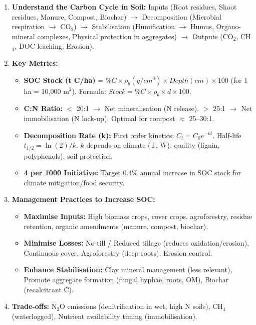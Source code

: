 \documentclass[11pt]{article}
\begin{document}
\begin{methode}
\begin{enumerate}
\item \textbf{Understand the Carbon Cycle in Soil:} Inputs (Root residues, Shoot residues, Manure, Compost, Biochar) $\rightarrow$ Decomposition (Microbial respiration $\rightarrow$ CO$_2$) $\rightarrow$ Stabilisation (Humification $\rightarrow$ Humus, Organo-mineral complexes, Physical protection in aggregates) $\rightarrow$ Outputs (CO$_2$, CH$_4$, DOC leaching, Erosion).
\item \textbf{Key Metrics:}
      \begin{itemize}
      \item \textbf{SOC Stock (t C/ha)} = $\%C \times \rho_b (g/cm^3) \times Depth (cm) \times 100$ (for 1 ha = 10,000 m$^2$). Formula: $Stock = \%C \times \rho_b \times d \times 100$.
      \item \textbf{C:N Ratio:} $<$ 20:1 $\rightarrow$ Net mineralisation (N release). $>$ 25:1 $\rightarrow$ Net immobilisation (N lock-up). Optimal for compost $\approx$ 25--30:1.
      \item \textbf{Decomposition Rate (k):} First order kinetics: $C_t = C_0 e^{-kt}$. Half-life $t_{1/2} = \ln(2)/k$. $k$ depends on climate (T, W), quality (lignin, polyphenols), soil protection.
      \item \textbf{4 per 1000 Initiative:} Target 0.4\% annual increase in SOC stock for climate mitigation/food security.
      \end{itemize}
\item \textbf{Management Practices to Increase SOC:}
      \begin{itemize}
      \item \textbf{Maximise Inputs:} High biomass crops, cover crops, agroforestry, residue retention, organic amendments (manure, compost, biochar).
      \item \textbf{Minimise Losses:} No-till / Reduced tillage (reduces oxidation/erosion), Continuous cover, Agroforestry (deep roots), Erosion control.
      \item \textbf{Enhance Stabilisation:} Clay mineral management (less relevant), Promote aggregate formation (fungal hyphae, roots, OM), Biochar (recalcitrant C).
      \end{itemize}
\item \textbf{Trade-offs:} N$_2$O emissions (denitrification in wet, high N soils), CH$_4$ (waterlogged), Nutrient availability timing (immobilisation).
\end{enumerate}
\end{methode}
\end{document}
